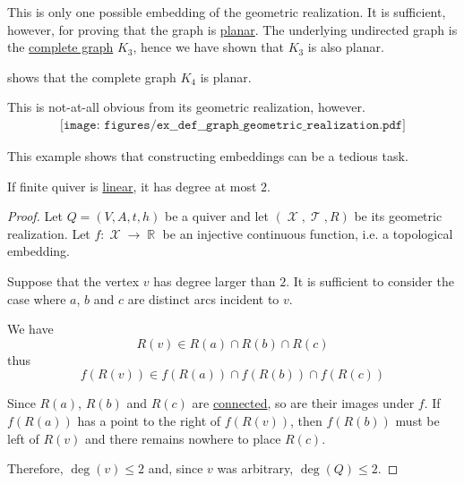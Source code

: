 \begin{example}
\begin{thmenum}
    This is only one possible embedding of the geometric realization. It is sufficient, however, for proving that the graph is \hyperref[def:quiver_geometric_realization/planar]{planar}. The underlying undirected graph is the \hyperref[ex:complete_graph]{complete graph} \( K_3 \), hence we have shown that \( K_3 \) is also planar.

      shows that the complete graph \( K_4 \) is planar.

    This is not-at-all obvious from its geometric realization, however.
    \begin{equation}\label{eq:ex:def:quiver_geometric_realization/k4/realization}
      \begin{aligned}
        \texttt{[image: figures/ex\_\_def\_\_graph\_geometric\_realization.pdf]}
      \end{aligned}
    \end{equation}

    This example shows that constructing embeddings can be a tedious task.
  \end{thmenum}
\end{example}

\begin{proposition}\label{thm:linear_quiver_equivalence}
  If finite quiver is \hyperref[def:quiver_geometric_realization/linear]{linear}, it has degree at most \( 2 \).
\end{proposition}
\begin{proof}
  Let \( Q = (V, A, t, h) \) be a quiver and let \( (\mscrX, \mscrT, R) \) be its geometric realization. Let \( f: \mscrX \to \BbbR \) be an injective continuous function, i.e. a topological embedding.

  Suppose that the vertex \( v \) has degree larger than \( 2 \). It is sufficient to consider the case where \( a \), \( b \) and \( c \) are distinct arcs incident to \( v \).

  We have
  \begin{equation*}
    R(v) \in R(a) \cap R(b) \cap R(c)
  \end{equation*}
  thus
  \begin{equation*}
    f(R(v)) \in f(R(a)) \cap f(R(b)) \cap f(R(c))
  \end{equation*}

  Since \( R(a) \), \( R(b) \) and \( R(c) \) are \hyperref[def:connected_space]{connected}, so are their images under \( f \). If \( f(R(a)) \) has a point to the right of \( f(R(v)) \), then \( f(R(b)) \) must be left of \( R(v) \) and there remains nowhere to place \( R(c) \).

  Therefore, \( \deg(v) \leq 2 \) and, since \( v \) was arbitrary, \( \deg(Q) \leq 2 \).
\end{proof}

